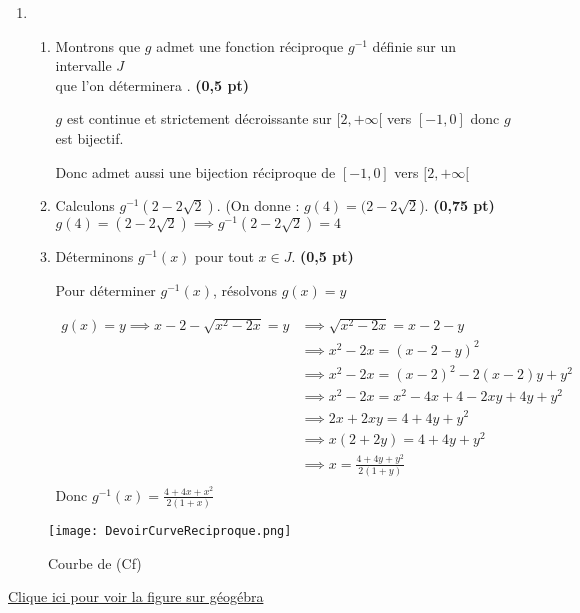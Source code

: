\documentclass[12pt,a4paper]{article}
\begin{document}
\begin{enumerate}
\item[]
\begin{enumerate}
\item Montrons que \( g \) admet une fonction réciproque \( g^{-1} \) définie sur un intervalle \( J \)\\ que l’on déterminera . \hspace{1cm} \textbf{(0,5 pt)}
    
\( g \) est continue et strictement décroissante sur \( [2, +\infty[ \) vers \( [-1, 0] \) donc \( g \) est bijectif.

Donc admet aussi une bijection réciproque de \( [-1, 0] \) vers \( [2, +\infty[ \)
   \item Calculons \( g^{-1}(2 - 2\sqrt{2}) \). (On donne : \( g(4) = (2 - 2\sqrt{2} \)). \hspace{1cm} \textbf{(0,75 pt)}\\
    \( g(4) = (2 - 2\sqrt{2}) \implies g^{-1}(2 - 2\sqrt{2}) = 4\)
    \item Déterminons \( g^{-1}(x) \) pour tout \( x \in J \). \hspace{3cm} \textbf{(0,5 pt)}
    
    Pour déterminer \( g^{-1}(x) \), résolvons \( g(x) = y \)
    
    \begin{align*}
    g(x) = y \implies  x - 2 - \sqrt{x^2 - 2x} = y &\implies \sqrt{x^2 - 2x} = x - 2 - y\\
    																								&\implies x^2 - 2x = (x - 2 - y)^{2}\\
    																								&\implies x^2 - 2x = (x-2)^{2}-2(x-2)y+y^{2}\\
    																								&\implies x^2 - 2x = x^{2}-4x+4-2xy+4y+y^{2}\\
    																								&\implies 2x+2xy = 4+4y+y^{2}\\
    																								&\implies x(2+2y) = 4+4y+y^{2}\\
    																								&\implies x = \frac{4+4y+y^{2}}{2(1+y)}\\
		\end{align*}     
		Donc \(\boxed{ g^{-1}(x) = \frac{4+4x+x^{2}}{2(1+x)}}\)
\end{enumerate}
\end{enumerate}
\begin{center}
\begin{figure}[H]%
\centering
\texttt{[image: DevoirCurveReciproque.png]}
\caption{Courbe de (Cf)}
\label{fig:monimage}
\end{figure}
\end{center}
\href{https://www.geogebra.org/classic/fmnqdcjv}{Clique ici pour voir la figure sur géogébra}
\end{document}
